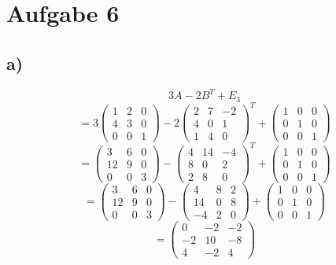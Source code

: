 \section{Aufgabe 6}
    \subsection{a)}
        $$3A-2B^T+E_3$$
        $$= 3 
        \begin{pmatrix}
            1 & 2 & 0\\
            4 & 3 & 0\\
            0 & 0 & 1
        \end{pmatrix}
        -2
        \begin{pmatrix}
            2 & 7 & -2 \\
            4 & 0 & 1 \\
            1 & 4 & 0
        \end{pmatrix}^T
        + \begin{pmatrix}
            1 & 0 & 0 \\
            0 & 1 & 0 \\
            0 & 0 & 1
        \end{pmatrix}
        $$
        $$=
        \begin{pmatrix}
            3 & 6 & 0\\
            12 & 9 & 0\\
            0 & 0 & 3
        \end{pmatrix}
        -
        \begin{pmatrix}
            4 & 14 & -4 \\
            8 & 0 & 2 \\
            2 & 8 & 0
        \end{pmatrix}^T
        + \begin{pmatrix}
            1 & 0 & 0 \\
            0 & 1 & 0 \\
            0 & 0 & 1
        \end{pmatrix}
        $$
        $$=
        \begin{pmatrix}
            3 & 6 & 0\\
            12 & 9 & 0\\
            0 & 0 & 3
        \end{pmatrix}
        -
        \begin{pmatrix}
            4 & 8 & 2 \\
            14 & 0 & 8 \\
            -4 & 2 & 0
        \end{pmatrix}
        + \begin{pmatrix}
            1 & 0 & 0 \\
            0 & 1 & 0 \\
            0 & 0 & 1
        \end{pmatrix}
        $$
        $$=
        \begin{pmatrix}
            0 & -2 & -2 \\
            -2 & 10 & -8 \\
            4 & -2 & 4
        \end{pmatrix}$$

